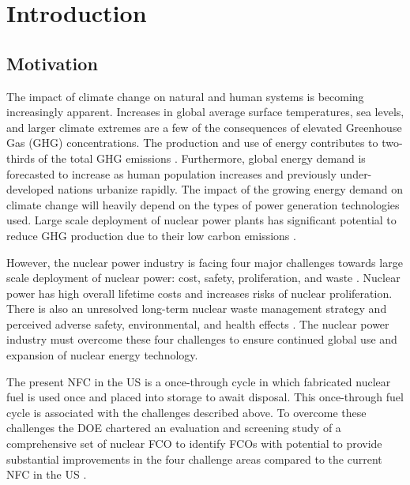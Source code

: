 \chapter[Introduction]{Introduction}
\label{chap:1}

\section{Motivation}

The impact of climate change on natural and human systems 
is becoming increasingly apparent.
Increases in global average 
surface temperatures, sea levels, and larger climate extremes
are a few of the consequences of elevated Greenhouse Gas (GHG) 
concentrations.
The production and use of energy contributes to 
two-thirds of the total GHG emissions \cite{noauthor_climate_2018}. 
Furthermore, global energy demand is forecasted to increase as human 
population increases and previously under-developed nations 
urbanize rapidly. 
The impact of the growing energy demand on climate change 
will heavily depend on the 
types of power generation technologies used. 
Large scale deployment of nuclear power plants has significant 
potential to reduce GHG production due to their low 
carbon emissions \cite{noauthor_climate_2018}.  

However, the nuclear power industry is facing four major challenges 
towards large scale deployment of nuclear power: 
cost, safety, proliferation, and waste 
\cite{massachusetts_institute_of_technology_future_2003}. 
Nuclear power has high overall lifetime costs and increases 
risks of nuclear proliferation. 
There is also an unresolved long-term nuclear waste management 
strategy and perceived adverse safety, environmental, and health 
effects \cite{massachusetts_institute_of_technology_future_2003}. 
The nuclear power industry must overcome these four challenges 
to ensure continued global use and expansion 
of nuclear energy technology. 

The present \gls{NFC} in the \gls{US} is a once-through cycle 
in which fabricated nuclear fuel is used once and placed into 
storage to await disposal. 
This once-through fuel cycle is associated with the 
challenges described above.
To overcome these challenges the 
\gls{DOE} chartered an evaluation and screening study 
of a comprehensive set of nuclear \gls{FCO} 
to identify \glspl{FCO} with potential 
to provide substantial improvements in the four challenge areas
compared to the current 
\gls{NFC} in the \gls{US} \cite{wigeland_nuclear_2014}. 

